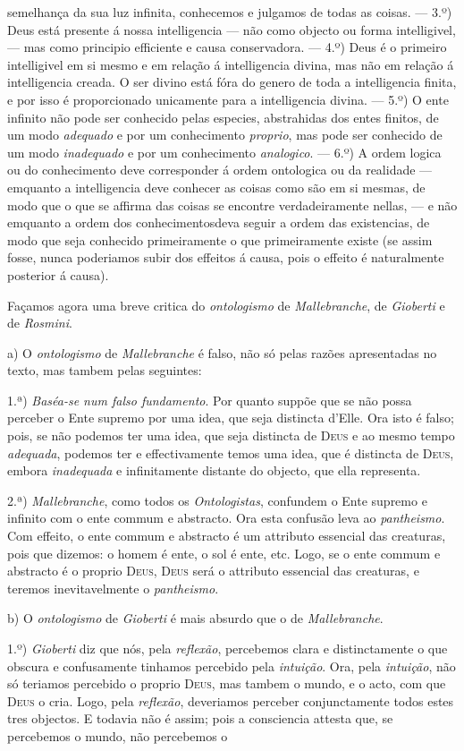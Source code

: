 semelhança da sua luz infinita, conhecemos e julgamos de todas as coisas. --- 3.º) Deus está presente á nossa intelligencia --- não como objecto ou forma intelligivel, --- mas como principio efficiente e causa conservadora. --- 4.º) Deus é o primeiro intelligivel em si mesmo e em relação á intelligencia divina, mas não em relação á intelligencia creada. O ser divino está fóra do genero de toda a intelligencia finita, e por isso é proporcionado unicamente para a intelligencia divina. --- 5.º) O ente infinito não pode ser conhecido pelas especies, abstrahidas dos entes finitos, de um modo \emph{adequado} e por um conhecimento \emph{proprio}, mas pode ser conhecido de um modo \emph{inadequado} e por um conhecimento \emph{analogico}. --- 6.º) A ordem logica ou do conhecimento deve corresponder á ordem ontologica ou da realidade --- emquanto a intelligencia deve conhecer as coisas como são em si mesmas, de modo que o que se affirma das coisas se encontre verdadeiramente nellas, --- e não emquanto a ordem dos conhecimentosdeva seguir a ordem das existencias, de modo que seja conhecido primeiramente o que primeiramente existe (se assim fosse, nunca poderiamos subir dos effeitos á causa, pois o effeito é naturalmente posterior á causa).\par Façamos agora uma breve critica do \emph{ontologismo} de \emph{Mallebranche}, de \emph{Gioberti} e de \emph{Rosmini}.\par a) O \emph{ontologismo} de \emph{Mallebranche} é falso, não só pelas razões apresentadas no texto, mas tambem pelas seguintes:\par 1.ª) \emph{Baséa-se num falso fundamento}. Por quanto suppõe que se não possa perceber o Ente supremo por uma idea, que seja distincta d'Elle. Ora isto é falso; pois, se não podemos ter uma idea, que seja distincta de \textsc{Deus} e ao mesmo tempo \emph{adequada}, podemos ter e effectivamente temos uma idea, que é distincta de \textsc{Deus}, embora \emph{inadequada} e infinitamente distante do objecto, que ella representa.\par 2.ª) \emph{Mallebranche}, como todos os \emph{Ontologistas}, confundem o Ente supremo e infinito com o ente commum e abstracto. Ora esta confusão leva ao \emph{pantheismo}. Com effeito, o ente commum e abstracto é um attributo essencial das creaturas, pois que dizemos: o homem é ente, o sol é ente, etc. Logo, se o ente commum e abstracto é o proprio \textsc{Deus}, \textsc{Deus} será o attributo essencial das creaturas, e teremos inevitavelmente o \emph{pantheismo}.\par b) O \emph{ontologismo} de \emph{Gioberti} é mais absurdo que o de \emph{Mallebranche}.\par 1.º) \emph{Gioberti} diz que nós, pela \emph{reflexão}, percebemos clara e distinctamente o que obscura e confusamente tinhamos percebido pela \emph{intuição}. Ora, pela \emph{intuição}, não só teriamos percebido o proprio \textsc{Deus}, mas tambem o mundo, e o acto, com que \textsc{Deus} o cria. Logo, pela \emph{reflexão}, deveriamos perceber conjunctamente todos estes tres objectos. E todavia não é assim; pois a consciencia attesta que, se percebemos o mundo, não percebemos o 